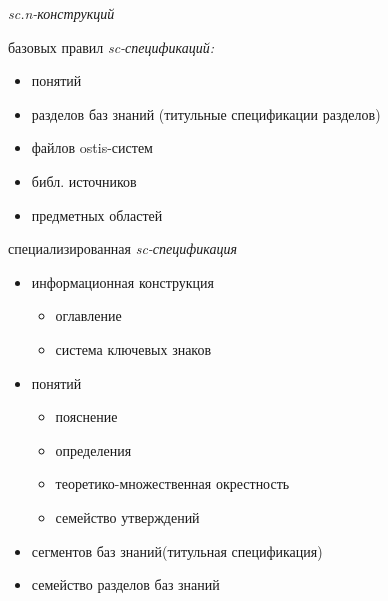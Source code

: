 \begin{SCn}
{\begin{scnitemize}
	\item\textit{sc.n-конструкций}
	\item базовых правил \textit{sc-спецификаций:}
	\begin{itemize}
		\item понятий 
		\item разделов баз знаний (титульные спецификации разделов)
		\item файлов ostis-систем
		\item библ. источников
		\item предметных областей 	
	\end{itemize}
	\item специализированная \textit{sc-спецификация}
	\begin{itemize}
		\item информационная конструкция
		\begin{itemize}
			\item оглавление
			\item система ключевых знаков	
		\end{itemize}
	\end{itemize}
	\begin{itemize}
		\item понятий
		\begin{itemize}
			\item пояснение
			\item определения
			\item теоретико-множественная окрестность
			\item семейство утверждений	
		\end{itemize}
	\end{itemize}
	\begin{itemize}
		\item сегментов баз знаний(титульная спецификация)
		\item семейство разделов баз знаний	
	\end{itemize}
\end{scnitemize}}

\scniselement{\scnstartsetlocal\scnendstructlocal}


\end{SCn}
